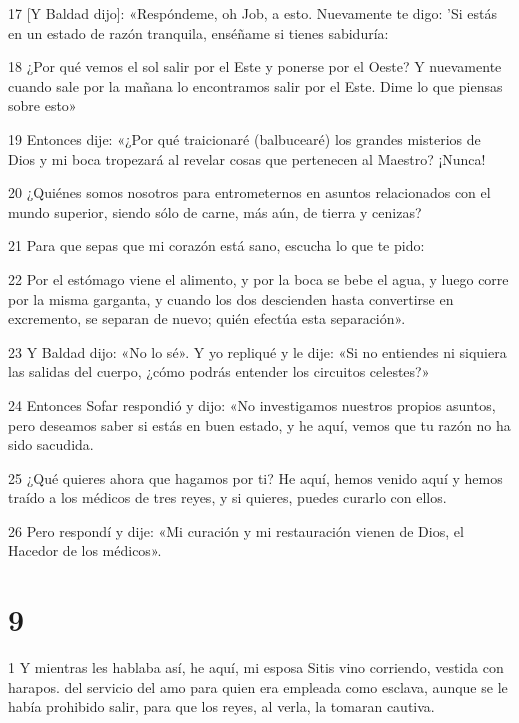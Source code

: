 \par 17 [Y Baldad dijo]: «Respóndeme, oh Job, a esto. Nuevamente te digo: 'Si estás en un estado de razón tranquila, enséñame si tienes sabiduría:

\par 18 ¿Por qué vemos el sol salir por el Este y ponerse por el Oeste? Y nuevamente cuando sale por la mañana lo encontramos salir por el Este. Dime lo que piensas sobre esto»

\par 19 Entonces dije: «¿Por qué traicionaré (balbucearé) los grandes misterios de Dios y mi boca tropezará al revelar cosas que pertenecen al Maestro? ¡Nunca!

\par 20 ¿Quiénes somos nosotros para entrometernos en asuntos relacionados con el mundo superior, siendo sólo de carne, más aún, de tierra y cenizas?

\par 21 Para que sepas que mi corazón está sano, escucha lo que te pido:

\par 22 Por el estómago viene el alimento, y por la boca se bebe el agua, y luego corre por la misma garganta, y cuando los dos descienden hasta convertirse en excremento, se separan de nuevo; quién efectúa esta separación».

\par 23 Y Baldad dijo: «No lo sé». Y yo repliqué y le dije: «Si no entiendes ni siquiera las salidas del cuerpo, ¿cómo podrás entender los circuitos celestes?»

\par 24 Entonces Sofar respondió y dijo: «No investigamos nuestros propios asuntos, pero deseamos saber si estás en buen estado, y he aquí, vemos que tu razón no ha sido sacudida.

\par 25 ¿Qué quieres ahora que hagamos por ti? He aquí, hemos venido aquí y hemos traído a los médicos de tres reyes, y si quieres, puedes curarlo con ellos.

\par 26 Pero respondí y dije: «Mi curación y mi restauración vienen de Dios, el Hacedor de los médicos».

\chapter{9}

\par 1 Y mientras les hablaba así, he aquí, mi esposa Sitis vino corriendo, vestida con harapos. del servicio del amo para quien era empleada como esclava, aunque se le había prohibido salir, para que los reyes, al verla, la tomaran cautiva.

